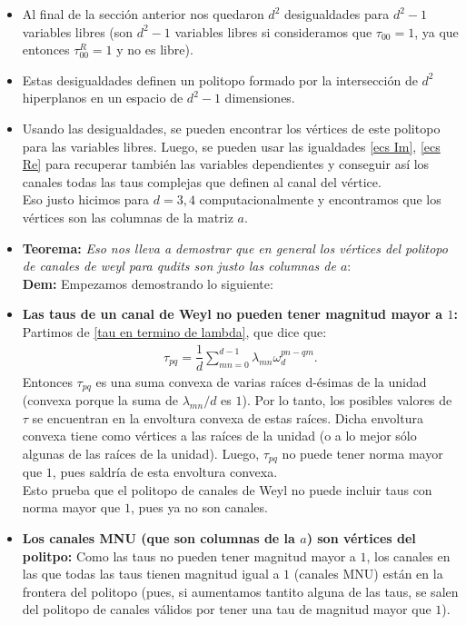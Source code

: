 \begin{itemize}
\item Al final de la sección anterior nos quedaron $d^2$ desigualdades para $d^2-1$ variables libres (son $d^2-1$ variables libres si consideramos que $\tau_{00} = 1$, ya que entonces $\tau_{00}^R = 1$ y no es libre). 
\item Estas desigualdades definen un politopo formado por la intersección de $d^2$ hiperplanos en un espacio de $d^2-1$ dimensiones. 
\item Usando las desigualdades, se pueden encontrar los vértices de este politopo para las variables libres. Luego, se pueden usar las igualdades \ref{ecs Im}, \ref{ecs Re} para recuperar también las variables dependientes y conseguir así los canales todas las taus complejas que definen al canal del vértice. \\

Eso justo hicimos para $d=3,4$ computacionalmente y encontramos que los vértices son las columnas de la matriz $a$. \\

\item\textbf{Teorema:} \textit{Eso nos lleva a demostrar que en general los vértices del politopo de canales de weyl para qudits son justo las columnas de $a$}: \\

\textbf{Dem:} Empezamos demostrando lo siguiente:

\item \textbf{Las taus de un canal de Weyl  no pueden tener magnitud mayor a $1$:} Partimos de \ref{tau en termino de lambda}, que dice que:
\begin{align*}
\tau_{pq} = \dfrac{1}{d} \sum_{mn=0}^{d-1} \lambda_{mn} \omega_d^{pn-qm}.
\end{align*}
Entonces $\tau_{pq}$ es una suma convexa de varias raíces d-ésimas de la unidad
(convexa porque la suma de $\lambda_{mn}/d $ es $1$). 
Por lo tanto, los posibles valores de $\tau$ se encuentran en la envoltura convexa
 de estas raíces. Dicha envoltura convexa tiene como vértices a las raíces de la unidad 
 (o a lo mejor sólo algunas de las raíces de la unidad).
 Luego, $\tau_{pq}$ no puede tener norma mayor que $1$, pues saldría de esta envoltura convexa.  \\
 
Esto prueba que el politopo de canales de Weyl no puede incluir taus con norma mayor que $1$, pues ya no son canales.
 
\item \textbf{Los canales MNU (que son columnas de la $a$) son vértices del politpo:} 
Como las taus no pueden tener magnitud mayor a $1$, 
los canales en las que todas las taus tienen magnitud igual a $1$ 
(canales MNU) están en la frontera del politopo
(pues, si aumentamos tantito alguna de las taus, 
se salen del politopo de canales válidos por tener una tau de magnitud mayor que $1$). \\
 

\end{itemize}
